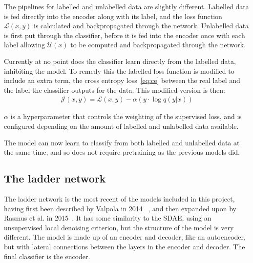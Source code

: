 The pipelines for labelled and unlabelled data are slightly different. Labelled data is fed directly into the encoder
along with its label, and the loss function $\mathcal{L}(x, y)$ is calculated and backpropagated through the network. Unlabelled data is 
first put through the classifier, before it is fed into the encoder once with each label allowing $\mathcal{U}(x)$ to be computed and 
backpropagated through the network.

Currently at no point does the classifier learn directly from the labelled data, inhibiting the model. To remedy
this the labelled loss function is modified to include an extra term, the cross entropy loss~\eqref{eq:ce} between the real label and the 
label the classifier outputs for the data. This modified version is then:
\begin{align}
  \mathcal{J}(x, y) = \mathcal{L}(x, y) - \alpha (y \cdot \log q(y|x))
\end{align}

$\alpha$ is a hyperparameter that controls the weighting of the supervised loss, and is configured depending on the amount of labelled and 
unlabelled data available.

The model can now learn to classify from both labelled and unlabelled data at the same time, and so does not require pretraining as
the previous models did.

\subsection{The ladder network} \label{ladder}

The ladder network is the most recent of the models included in this project, having first been described by Valpola in 2014
~\cite{DBLP:journals/corr/Valpola14}, and then expanded upon by Rasmus et al. in 2015~\cite{DBLP:journals/corr/RasmusVHBR15}. 
It has some similarity to the SDAE, using an unsupervised local denoising criterion, but the structure of the model is very different.
The model is made up of an encoder and decoder, like an autoencoder, but with lateral connections between the layers in the encoder 
and decoder. The final classifier is the encoder.

